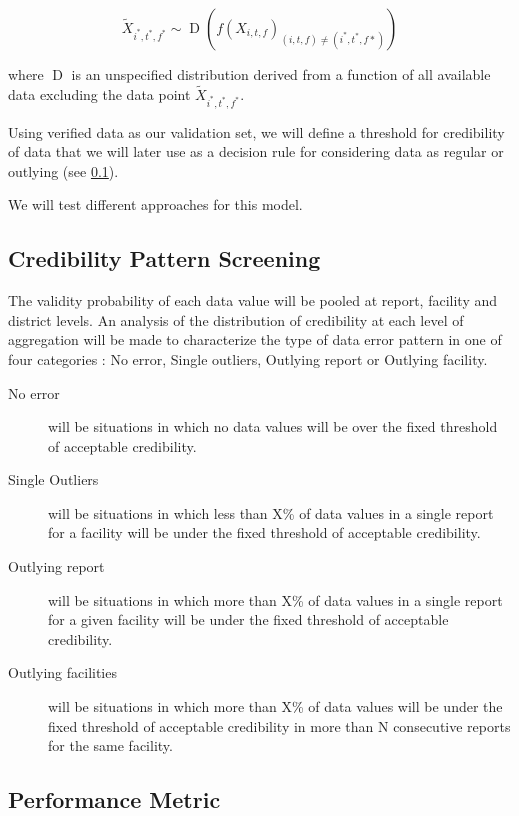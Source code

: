 $$ \widetilde{X}_{i^*,t^*,f^*} \sim \operatorname{D} \left(f\left(X_{i,t,f}\right)_{ \left(i,t,f\right) \neq \left(i^*,t^*,f*\right) } \right) $$

where $\operatorname{D}$ is an unspecified distribution derived from a function of all available data excluding the data point $\widetilde{X}_{i^*,t^*,f^*}$.

Using verified data as our validation set, we will define a threshold for credibility of data that we will later use as a decision rule for considering data as regular or outlying (see \ref{paper2_credib_pattern}).

We will test different approaches for this model.


\subsection{Credibility Pattern Screening}
\label{paper2_credib_pattern}

The validity probability of each data value will be pooled at report, facility and district levels. An analysis of the distribution of credibility at each level of aggregation will be made to characterize the type of data error pattern in one of four categories : No error, Single outliers, Outlying report or Outlying facility.
\begin{description}
	\item[No error] will be situations in which no data values will be over the fixed threshold of acceptable credibility.
	\item[Single Outliers] will be situations in which less than X\% of data values in a single report for a facility will be under the fixed threshold of acceptable credibility.
	\item[Outlying report] will be situations in which more than X\% of data values in a single report for a given facility will be under the fixed threshold of acceptable credibility.
	\item[Outlying facilities] will be situations in which more than X\% of data values will be under the fixed threshold of acceptable credibility in more than N consecutive reports for the same facility.
\end{description}

\subsection{Performance Metric}

